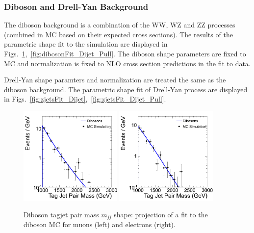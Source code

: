 \subsubsection{Diboson and Drell-Yan Background}
The diboson background is a combination of the WW, WZ and ZZ processes (combined in MC based on their expected cross sections). 
The results of the parametric shape fit to the simulation are displayed in Figs.~\ref{fig:dibosonFit_Dijet},~\ref{fig:dibosonFit_Dijet_Pull}. The diboson shape parameters are fixed to MC and normalization is fixed to NLO cross section predictions in the fit to data.

Drell-Yan shape paramters and normalization are treated the same as the diboson background. The parametric shape fit of Drell-Yan process are displayed in Figs.~\ref{fig:zjetsFit_Dijet},~\ref{fig:zjetsFit_Dijet_Pull}.

\begin{figure}
\begin{center}
\includegraphics[width=0.45\textwidth]{figs/wpj/EWKW2jetstagjetmjj_diboson_muon_Model_12_Validate.png}
\includegraphics[width=0.45\textwidth]{figs/wpj/EWKW2jetstagjetmjj_diboson_electron_Model_12_Validate.png}
\end{center}
\caption{\label{fig:dibosonFit} Diboson tagjet pair mass $m_{jj}$ shape: projection of a fit to the diboson MC for muons (left) and electrons (right).}
\label{fig:dibosonFit_Dijet}
\end{figure}

